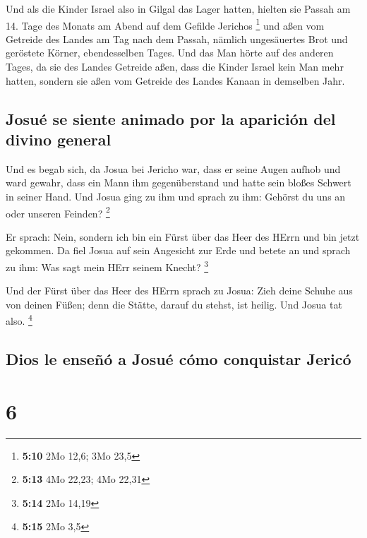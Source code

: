  Und als die Kinder Israel also in Gilgal das Lager
hatten, hielten sie Passah am 14. Tage des Monats am Abend auf dem
Gefilde Jerichos \footnote{\textbf{5:10} 2Mo 12,6; 3Mo 23,5}
 und aßen vom Getreide des Landes am Tag nach dem Passah,
nämlich ungesäuertes Brot und geröstete Körner, ebendesselben Tages.
 Und das Man hörte auf des anderen Tages, da sie des
Landes Getreide aßen, dass die Kinder Israel kein Man mehr hatten,
sondern sie aßen vom Getreide des Landes Kanaan in demselben Jahr.

\hypertarget{josuuxe9-se-siente-animado-por-la-apariciuxf3n-del-divino-general}{%
\subsection{Josué se siente animado por la aparición del divino
general}\label{josuuxe9-se-siente-animado-por-la-apariciuxf3n-del-divino-general}}

 Und es begab sich, da Josua bei Jericho war, dass er
seine Augen aufhob und ward gewahr, dass ein Mann ihm gegenüberstand und
hatte sein bloßes Schwert in seiner Hand. Und Josua ging zu ihm und
sprach zu ihm: Gehörst du uns an oder unseren Feinden? \footnote{\textbf{5:13}
  4Mo 22,23; 4Mo 22,31}

 Er sprach: Nein, sondern ich bin ein Fürst über das Heer
des HErrn und bin jetzt gekommen. Da fiel Josua auf sein Angesicht zur
Erde und betete an und sprach zu ihm: Was sagt mein HErr seinem Knecht?
\footnote{\textbf{5:14} 2Mo 14,19}

 Und der Fürst über das Heer des HErrn sprach zu Josua:
Zieh deine Schuhe aus von deinen Füßen; denn die Stätte, darauf du
stehst, ist heilig. Und Josua tat also. \footnote{\textbf{5:15} 2Mo 3,5}

\hypertarget{dios-le-enseuxf1uxf3-a-josuuxe9-cuxf3mo-conquistar-jericuxf3}{%
\subsection{Dios le enseñó a Josué cómo conquistar
Jericó}\label{dios-le-enseuxf1uxf3-a-josuuxe9-cuxf3mo-conquistar-jericuxf3}}

\hypertarget{section-5}{%
\section{6}\label{section-5}}


